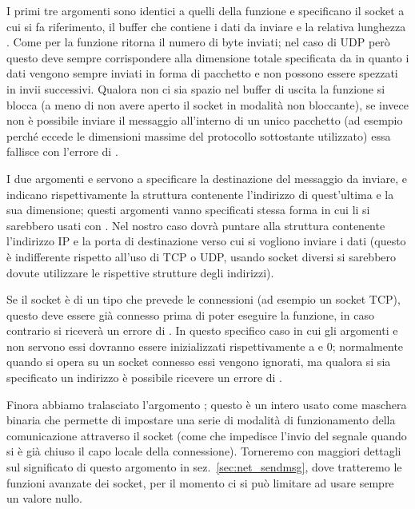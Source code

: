 I primi tre argomenti sono identici a quelli della funzione  e
specificano il socket  a cui si fa riferimento, il buffer
 che contiene i dati da inviare e la relativa lunghezza
.  Come per  la funzione ritorna il numero di byte
inviati; nel caso di UDP però questo deve sempre corrispondere alla dimensione
totale specificata da  in quanto i dati vengono sempre inviati in
forma di pacchetto e non possono essere spezzati in invii successivi.  Qualora
non ci sia spazio nel buffer di uscita la funzione si blocca (a meno di non
avere aperto il socket in modalità non bloccante), se invece non è possibile
inviare il messaggio all'interno di un unico pacchetto (ad esempio perché
eccede le dimensioni massime del protocollo sottostante utilizzato) essa
fallisce con l'errore di . 

I due argomenti  e  servono a specificare la
destinazione del messaggio da inviare, e indicano rispettivamente la struttura
contenente l'indirizzo di quest'ultima e la sua dimensione; questi argomenti
vanno specificati stessa forma in cui li si sarebbero usati con
. Nel nostro caso  dovrà puntare alla struttura
contenente l'indirizzo IP e la porta di destinazione verso cui si vogliono
inviare i dati (questo è indifferente rispetto all'uso di TCP o UDP, usando
socket diversi si sarebbero dovute utilizzare le rispettive strutture degli
indirizzi).

Se il socket è di un tipo che prevede le connessioni (ad esempio un socket
TCP), questo deve essere già connesso prima di poter eseguire la funzione, in
caso contrario si riceverà un errore di . In questo
specifico caso in cui gli argomenti  e  non servono
essi dovranno essere inizializzati rispettivamente a  e 0;
normalmente quando si opera su un socket connesso essi vengono ignorati, ma
qualora si sia specificato un indirizzo è possibile ricevere un errore di
.

Finora abbiamo tralasciato l'argomento ; questo è un intero usato
come maschera binaria che permette di impostare una serie di modalità di
funzionamento della comunicazione attraverso il socket (come
 che impedisce l'invio del segnale 
quando si è già chiuso il capo locale della connessione). Torneremo con
maggiori dettagli sul significato di questo argomento in
sez.~\ref{sec:net_sendmsg}, dove tratteremo le funzioni avanzate dei socket,
per il momento ci si può limitare ad usare sempre un valore nullo.

